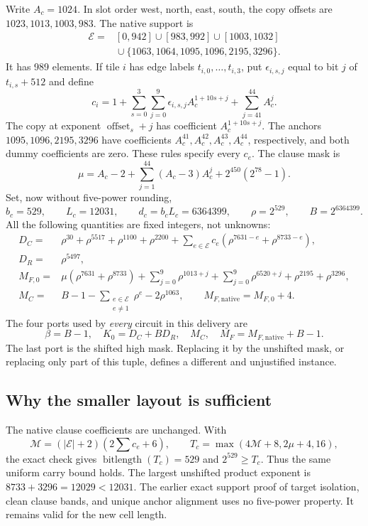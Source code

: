 \documentclass[11pt,letterpaper]{article}
\theoremstyle{remark}
\begin{document}
Write $A_c=1024$.  In slot order west, north, east, south, the copy offsets
are $1023,1013,1003,983$.  The native support is
\begin{align*}
\mathcal E={}&[0,942]\cup[983,992]\cup[1003,1032]\\
 &{}\cup\{1063,1064,1095,1096,2195,3296\}.
\end{align*}
It has 989 elements.  If tile $i$ has edge labels $t_{i,0},\ldots,t_{i,3}$,
put $\epsilon_{i,s,j}$ equal to bit $j$ of $t_{i,s}+512$ and define
\[
 c_i=1+\sum_{s=0}^3\sum_{j=0}^9
          \epsilon_{i,s,j}A_c^{1+10s+j}+\sum_{j=41}^{44}A_c^j.
\]
The copy at exponent $\operatorname{offset}_s+j$ has coefficient
$A_c^{1+10s+j}$.  The anchors $1095,1096,2195,3296$ have coefficients
$A_c^{41},A_c^{42},A_c^{43},A_c^{44}$, respectively, and both dummy
coefficients are zero.  These rules specify every $c_e$.
The clause mask is
\[
 \mu=A_c-2+\sum_{j=1}^{44}(A_c-3)A_c^j+2^{450}(2^{78}-1).
\]
Set, now without five-power rounding,
\[
 b_c=529,\qquad L_c=12031,\qquad d_c=b_cL_c=6364399,
 \qquad \rho=2^{529},\qquad B=2^{6364399}.
\]
All the following quantities are fixed integers, not unknowns:
\begin{align*}
D_C={}&\rho^{30}+\rho^{5517}+\rho^{1100}+\rho^{2200}
       +\sum_{e\in\mathcal E}c_e
                 (\rho^{7631-e}+\rho^{8733-e}),\\
D_R={}&\rho^{5497},\\
M_{F,0}={}&\mu(\rho^{7631}+\rho^{8733})
       +\sum_{j=0}^9\rho^{1013+j}+\sum_{j=0}^9\rho^{6520+j}
       +\rho^{2195}+\rho^{3296},\\
M_C={}&B-1-\sum_{\substack{e\in\mathcal E\\e\ne1}}\rho^e
              -2\rho^{1063},\qquad M_{F,\mathrm{native}}=M_{F,0}+4.
\end{align*}
The four ports used by \emph{every} circuit in this delivery are
\begin{equation}\label{eq:four-ports}
 \boxed{\ \beta=B-1,\quad K_0=D_C+BD_R,\quad
 M_C,\quad M_F=M_{F,\mathrm{native}}+B-1.\ }
\end{equation}
The last port is the shifted high mask.  Replacing it by the unshifted
mask, or replacing only part of this tuple, defines a different and
unjustified instance.

\subsection{Why the smaller layout is sufficient}

The native clause coefficients are unchanged.  With
\[
 \mathcal M=(|\mathcal E|+2)\left(2\sum c_e+6\right),\qquad
 T_c=\max(4\mathcal M+8,2\mu+4,16),
\]
the exact check gives $\operatorname{bitlength}(T_c)=529$ and
$2^{529}\ge T_c$.  Thus the same uniform carry bound holds.
The largest unshifted product exponent is
$8733+3296=12029<12031$.  The earlier exact support proof of target
isolation, clean clause bands, and unique anchor alignment uses no
five-power property.  It remains valid for the new cell length.
\end{document}
